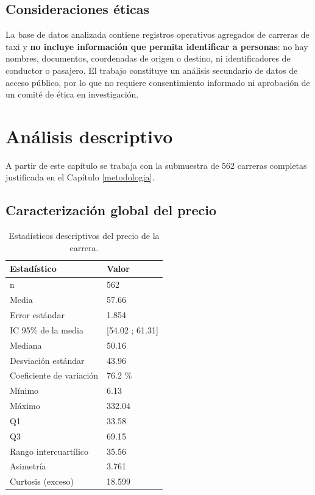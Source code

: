 \documentclass[
]{book}
\begin{document}
\section{Consideraciones éticas}\label{consideraciones-uxe9ticas}

La base de datos analizada contiene registros operativos agregados de carreras de taxi y \textbf{no
incluye información que permita identificar a personas}: no hay nombres, documentos,
coordenadas de origen o destino, ni identificadores de conductor o pasajero. El trabajo
constituye un análisis secundario de datos de acceso público, por lo que no requiere
consentimiento informado ni aprobación de un comité de ética en investigación.

\chapter{Análisis descriptivo}\label{descriptivo}

A partir de este capítulo se trabaja con la submuestra de 562 carreras completas
justificada en el Capítulo \ref{metodologia}.

\section{Caracterización global del precio}\label{caracterizaciuxf3n-global-del-precio}

\begin{table}

\caption{\label{tab:desc-global}Estadísticos descriptivos del precio de la carrera.}
\centering
\begin{tabular}[t]{l|l}
\hline
Estadístico & Valor\\
\hline
n & 562\\
\hline
Media & 57.66\\
\hline
Error estándar & 1.854\\
\hline
IC 95\% de la media & [54.02 ; 61.31]\\
\hline
Mediana & 50.16\\
\hline
Desviación estándar & 43.96\\
\hline
Coeficiente de variación & 76.2 \%\\
\hline
Mínimo & 6.13\\
\hline
Máximo & 332.04\\
\hline
Q1 & 33.58\\
\hline
Q3 & 69.15\\
\hline
Rango intercuartílico & 35.56\\
\hline
Asimetría & 3.761\\
\hline
Curtosis (exceso) & 18.599\\
\hline
\end{tabular}
\end{table}
\end{document}
